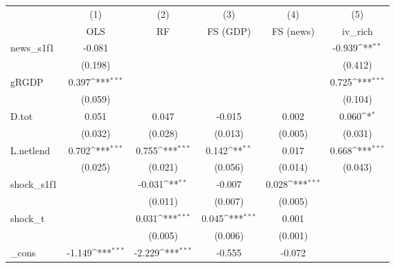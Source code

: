 {
\def\sym#1{\ifmmode^{#1}\else\(^{#1}\)\fi}
\begin{tabular}{l*{5}{c}}
\toprule
            &\multicolumn{1}{c}{(1)}&\multicolumn{1}{c}{(2)}&\multicolumn{1}{c}{(3)}&\multicolumn{1}{c}{(4)}&\multicolumn{1}{c}{(5)}\\
            &\multicolumn{1}{c}{OLS}&\multicolumn{1}{c}{RF}&\multicolumn{1}{c}{FS (GDP)}&\multicolumn{1}{c}{FS (news)}&\multicolumn{1}{c}{iv\_rich}\\
\midrule
news\_s1f1   &      -0.081         &                     &                     &                     &      -0.939\sym{**} \\
            &     (0.198)         &                     &                     &                     &     (0.412)         \\
\addlinespace
gRGDP       &       0.397\sym{***}&                     &                     &                     &       0.725\sym{***}\\
            &     (0.059)         &                     &                     &                     &     (0.104)         \\
\addlinespace
D.tot       &       0.051         &       0.047         &      -0.015         &       0.002         &       0.060\sym{*}  \\
            &     (0.032)         &     (0.028)         &     (0.013)         &     (0.005)         &     (0.031)         \\
\addlinespace
L.netlend   &       0.702\sym{***}&       0.755\sym{***}&       0.142\sym{**} &       0.017         &       0.668\sym{***}\\
            &     (0.025)         &     (0.021)         &     (0.056)         &     (0.014)         &     (0.043)         \\
\addlinespace
shock\_s1f1  &                     &      -0.031\sym{**} &      -0.007         &       0.028\sym{***}&                     \\
            &                     &     (0.011)         &     (0.007)         &     (0.005)         &                     \\
\addlinespace
shock\_t     &                     &       0.031\sym{***}&       0.045\sym{***}&       0.001         &                     \\
            &                     &     (0.005)         &     (0.006)         &     (0.001)         &                     \\
\addlinespace
\_cons      &      -1.149\sym{***}&      -2.229\sym{***}&      -0.555         &      -0.072         &                     \\

\end{tabular}}
